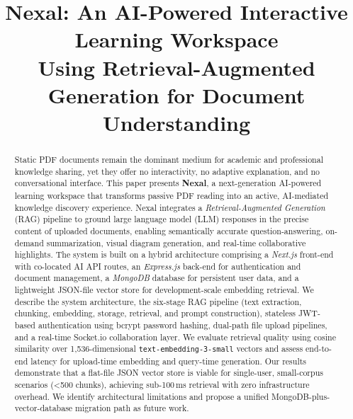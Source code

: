 \documentclass[conference]{IEEEtran}
\begin{document}
\title{Nexal: An AI-Powered Interactive Learning Workspace\\
Using Retrieval-Augmented Generation for Document Understanding}

\author{
}

\maketitle

\begin{abstract}
Static PDF documents remain the dominant medium for academic and professional knowledge sharing, yet they offer no interactivity, no adaptive explanation, and no conversational interface. This paper presents \textbf{Nexal}, a next-generation AI-powered learning workspace that transforms passive PDF reading into an active, AI-mediated knowledge discovery experience. Nexal integrates a \emph{Retrieval-Augmented Generation} (RAG) pipeline to ground large language model (LLM) responses in the precise content of uploaded documents, enabling semantically accurate question-answering, on-demand summarization, visual diagram generation, and real-time collaborative highlights. The system is built on a hybrid architecture comprising a \textit{Next.js} front-end with co-located AI API routes, an \textit{Express.js} back-end for authentication and document management, a \textit{MongoDB} database for persistent user data, and a lightweight JSON-file vector store for development-scale embedding retrieval. We describe the system architecture, the six-stage RAG pipeline (text extraction, chunking, embedding, storage, retrieval, and prompt construction), stateless JWT-based authentication using bcrypt password hashing, dual-path file upload pipelines, and a real-time Socket.io collaboration layer. We evaluate retrieval quality using cosine similarity over 1,536-dimensional \texttt{text-embedding-3-small} vectors and assess end-to-end latency for upload-time embedding and query-time generation. Our results demonstrate that a flat-file JSON vector store is viable for single-user, small-corpus scenarios (\textless{}500 chunks), achieving sub-100\,ms retrieval with zero infrastructure overhead. We identify architectural limitations and propose a unified MongoDB-plus-vector-database migration path as future work.
\end{abstract}
\end{document}

